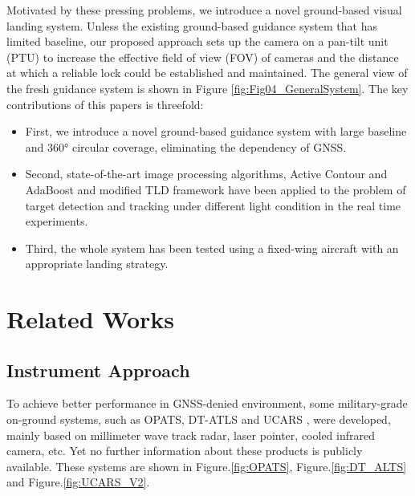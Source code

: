 Motivated by these pressing problems, we introduce a novel ground-based visual landing system. Unless the existing ground-based guidance system that has limited baseline, our proposed approach sets up the camera on a pan-tilt unit (PTU) to increase the effective field of view (FOV) of cameras and the distance at which a reliable lock could be established and maintained. The general view of the fresh guidance system is shown in Figure \ref{fig:Fig04_GeneralSystem}. The key contributions of this papers is threefold:
\begin{itemize}
	\item First, we introduce a novel ground-based guidance system with large baseline and 360° circular coverage, eliminating the dependency of GNSS.
	\item Second, state-of-the-art image processing algorithms, Active Contour and AdaBoost and modified TLD framework have been applied to the problem of target detection and tracking under different light condition in the real time experiments.
	\item Third, the whole system has been tested using a fixed-wing aircraft with an appropriate landing strategy.
\end{itemize}



\section{Related Works}

\subsection{Instrument Approach}
To achieve better performance in GNSS-denied environment, some military-grade on-ground systems, such as OPATS\cite{RUAG}, DT-ATLS\cite{SierraNevadaCorporation} and UCARS \cite{SierraNevadaCorporationa}, were developed, mainly based on millimeter wave track radar, laser pointer, cooled infrared camera, etc. Yet no further information about these products is publicly available. These systems are shown in Figure.\ref{fig:OPATS}, Figure.\ref{fig:DT_ALTS} and Figure.\ref{fig:UCARS_V2}.

